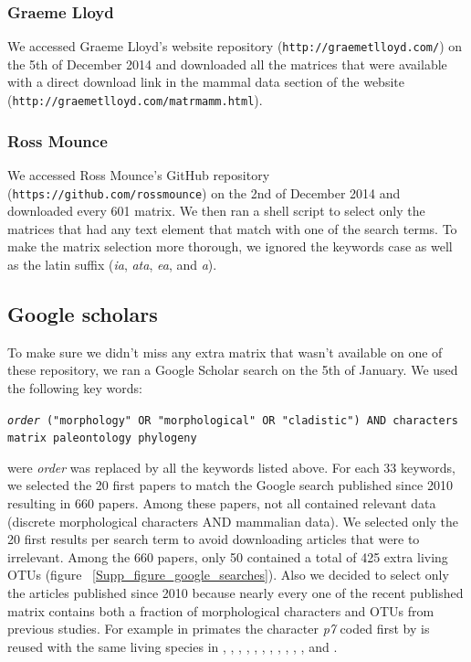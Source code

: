 \subsubsection{Graeme Lloyd}
We accessed Graeme Lloyd's website repository (\texttt{http://graemetlloyd.com/}) on the 5th of December 2014 and downloaded all the matrices that were available with a direct download link in the mammal data section of the website (\texttt{http://graemetlloyd.com/matrmamm.html}).

\subsubsection{Ross Mounce}
We accessed Ross Mounce's GitHub repository (\texttt{https://github.com/rossmounce}) on the 2nd of December 2014 and downloaded every 601 matrix. We then ran a shell script to select only the matrices that had any text element that match with one of the search terms. To make the matrix selection more thorough, we ignored the keywords case as well as the latin suffix (\textit{ia}, \textit{ata}, \textit{ea}, and \textit{a}).

\subsection{Google scholars}
To make sure we didn't miss any extra matrix that wasn't available on one of these repository, we ran a Google Scholar search on the 5th of January. We used the following key words:

\texttt{\textit{order} ("morphology" OR "morphological" OR "cladistic") AND characters matrix paleontology phylogeny}

were \textit{order} was replaced by all the keywords listed above. For each 33 keywords, we selected the 20 first papers to match the Google search published since 2010 resulting in 660 papers. Among these papers, not all contained relevant data (discrete morphological characters AND mammalian data). We selected only the 20 first results per search term to avoid downloading articles that were to irrelevant. Among the 660 papers, only 50 contained a total of 425 extra living OTUs (figure ~\ref{Supp_figure_google_searches}).
Also we decided to select only the articles published since 2010 because nearly every one of the recent published matrix contains both a fraction of morphological characters and OTUs from previous studies. For example in primates the character \textit{p7} coded first by \cite{ross1998phylogenetic} is reused with the same living species in \cite{seiffert2003fossil}, \cite{marivaux2005anthropoid}, \cite{seiffert2005basal}, \cite{bloch2007new}, \cite{bloch2007new}, \cite{kay2008anatomy}, \cite{silcox2008biogeographic}, \cite{seiffert2009convergent}, \cite{tabuce2009anthropoid}, \cite{boyer2010astragalar}, \cite{seiffert2010fossil}, \cite{marivaux2013djebelemur} and \cite{ni2013oldest}.


